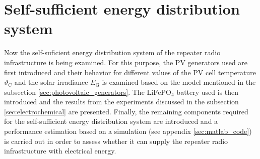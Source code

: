 \section{Self-sufficient energy distribution system} \label{sec:energy}
Now the self-suficient energy distribution system of the repeater radio infrastructure is being examined. For this purpose, the PV generators used are first introduced and their behavior for different values of the PV cell temperature $\vartheta_\mathrm{C}$ and the solar irradiance $E_\mathrm{G}$ is examined based on the model mentioned in the subsection \ref{sec:photovoltaic_generators}. The $\mathrm{LiFePO}_4$ battery used is then introduced and the results from the experiments discussed in the subsection \ref{sec:electrochemical} are presented. Finally, the remaining components required for the self-sufficient energy distribution system are introduced and a performance estimation based on a \MATLAB simulation (see appendix \ref{sec:matlab_code}) is carried out in order to assess whether it can supply the repeater radio infrastructure with electrical energy. 





